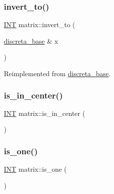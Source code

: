 \mbox{\label{classmatrix_a137bc3b88c71382c675dea7a0bf9b5f2}} 
\subsubsection{\texorpdfstring{invert\+\_\+to()}{invert\_to()}}
{\footnotesize\ttfamily \mbox{\hyperlink{galois_8h_a09fddde158a3a20bd2dcadb609de11dc}{I\+NT}} matrix\+::invert\+\_\+to (\begin{DoxyParamCaption}\item[{\mbox{\hyperlink{classdiscreta__base}{discreta\+\_\+base}} \&}]{x }\end{DoxyParamCaption})\hspace{0.3cm}{\ttfamily [virtual]}}



Reimplemented from \mbox{\hyperlink{classdiscreta__base_a874a5ffb467f3896604a3c9bdf0cca50}{discreta\+\_\+base}}.

\mbox{\label{classmatrix_aecb27f51504ac8d90bb280b6a851942d}} 
\subsubsection{\texorpdfstring{is\+\_\+in\+\_\+center()}{is\_in\_center()}}
{\footnotesize\ttfamily \mbox{\hyperlink{galois_8h_a09fddde158a3a20bd2dcadb609de11dc}{I\+NT}} matrix\+::is\+\_\+in\+\_\+center (\begin{DoxyParamCaption}{ }\end{DoxyParamCaption})}

\mbox{\label{classmatrix_a74aa38df064afa998cb0973ac3554ac0}} 
\subsubsection{\texorpdfstring{is\+\_\+one()}{is\_one()}}
{\footnotesize\ttfamily \mbox{\hyperlink{galois_8h_a09fddde158a3a20bd2dcadb609de11dc}{I\+NT}} matrix\+::is\+\_\+one (\begin{DoxyParamCaption}{ }\end{DoxyParamCaption})\hspace{0.3cm}{\ttfamily [virtual]}}



